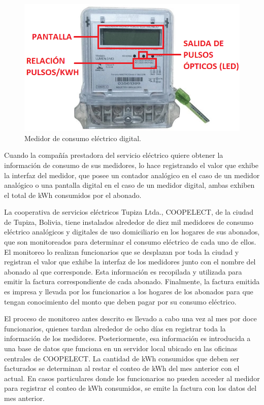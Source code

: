 \begin{figure}[h]
	\centering
	\includegraphics[scale=0.55]{./Figures/digital_meter.png}
	\caption{ Medidor de consumo eléctrico digital\protect\footnotemark.}
	\label{fig:digitalMeter}
\end{figure}

Cuando la compañía prestadora del servicio eléctrico quiere obtener la información de consumo de sus medidores, lo hace registrando el valor que exhibe la interfaz del medidor, que posee un contador analógico en el caso de un medidor analógico o una pantalla digital en el caso de un medidor digital, ambas exhiben el total de kWh consumidos por el abonado.

La cooperativa de servicios eléctricos Tupiza Ltda., COOPELECT, de la ciudad de Tupiza, Bolivia, tiene instalados alrededor de diez mil medidores de consumo eléctrico analógicos y digitales de uso domiciliario en los hogares de sus abonados, que son monitoreados para determinar el consumo eléctrico de cada uno de ellos. El monitoreo lo realizan funcionarios que se desplazan por toda la ciudad y registran el valor que exhibe la interfaz de los medidores junto con el nombre del abonado al que corresponde. Esta información es recopilada y utilizada para emitir la factura correspondiente de cada abonado. Finalmente, la factura emitida es impresa y llevada por los funcionarios a los hogares de los abonados para que tengan conocimiento del monto que deben pagar por su consumo eléctrico.

El proceso de monitoreo antes descrito es llevado a cabo una vez al mes por doce funcionarios, quienes tardan alrededor de ocho días en registrar toda la información de los medidores. Posteriormente, esa información es introducida a una base de datos que funciona en un servidor local ubicado en las oficinas centrales de COOPELECT. La cantidad de kWh consumidos que deben ser facturados se determinan al restar el conteo de kWh del mes anterior con el actual. En casos particulares donde los funcionarios no pueden acceder al medidor para registrar el conteo de kWh consumidos, se emite la factura con los datos del mes anterior.

